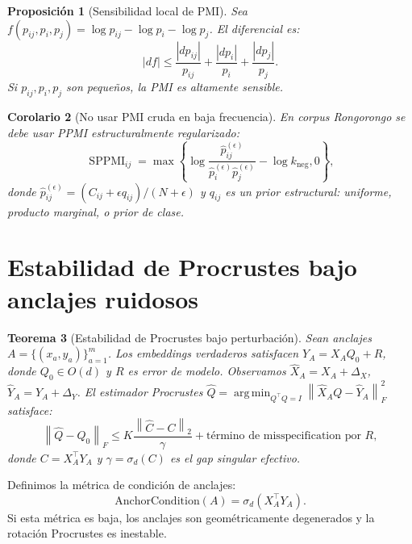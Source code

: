 \documentclass[11pt,a4paper]{article}
\newtheorem{theorem}{Teorema}[section]
\newtheorem{proposition}[theorem]{Proposición}
\newtheorem{corollary}[theorem]{Corolario}
\DeclareMathOperator*{\argmin}{arg\,min}
\newcommand{\1}{\mathbf{1}}
\newcommand{\norm}[1]{\left\lVert #1 \right\rVert}
\numberwithin{equation}{section}
\begin{document}
\begin{proposition}[Sensibilidad local de PMI]
\label{prop:pmi_sensitivity}
Sea $f(p_{ij},p_i,p_j)=\log p_{ij}-\log p_i-\log p_j$. El diferencial es:
\begin{equation}
    |df|\leq\frac{|dp_{ij}|}{p_{ij}}+\frac{|dp_i|}{p_i}+\frac{|dp_j|}{p_j}.
\end{equation}
Si $p_{ij},p_i,p_j$ son pequeños, la PMI es altamente sensible.
\end{proposition}

\begin{corollary}[No usar PMI cruda en baja frecuencia]
En corpus Rongorongo se debe usar PPMI estructuralmente regularizado:
\begin{equation}
    \operatorname{SPPMI}_{ij}
    =
    \max\left\{
    \log\frac{\widehat p_{ij}^{(\epsilon)}}{\widehat p_i^{(\epsilon)}\widehat p_j^{(\epsilon)}}
    -
    \log k_{\mathrm{neg}},
    0
    \right\},
\end{equation}
donde $\widehat p_{ij}^{(\epsilon)}=(C_{ij}+\epsilon q_{ij})/(N+\epsilon)$ y $q_{ij}$ es un prior estructural: uniforme, producto marginal, o prior de clase.
\end{corollary}

\section{Estabilidad de Procrustes bajo anclajes ruidosos}
\label{sec:procrustes_stability}

\begin{theorem}[Estabilidad de Procrustes bajo perturbación]
\label{thm:procrustes_stability}
Sean anclajes $A=\{(x_a,y_a)\}_{a=1}^m$. Los embeddings verdaderos satisfacen $Y_A=X_AQ_0+R$, donde $Q_0\in O(d)$ y $R$ es error de modelo. Observamos $\widehat X_A=X_A+\Delta_X$, $\widehat Y_A=Y_A+\Delta_Y$. El estimador Procrustes $\widehat Q=\argmin_{Q^\top Q=I}\norm{\widehat X_AQ-\widehat Y_A}_F^2$ satisface:
\begin{equation}
    \norm{\widehat Q-Q_0}_F
    \leq
    K\frac{\norm{\widehat C-C}_2}{\gamma}
    +
    \text{término de misspecification por }R,
\end{equation}
donde $C=X_A^\top Y_A$ y $\gamma=\sigma_d(C)$ es el gap singular efectivo.
\end{theorem}

Definimos la métrica de condición de anclajes:
\begin{equation}
    \mathrm{AnchorCondition}(A)=\sigma_d(X_A^\top Y_A).
\end{equation}
Si esta métrica es baja, los anclajes son geométricamente degenerados y la rotación Procrustes es inestable.
\end{document}
